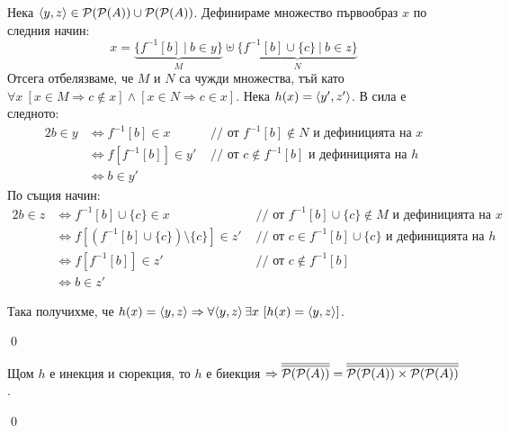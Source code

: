 \begin{tcolorbox}[mybox={Доказателство:}]
\quad
Нека $\langle y, z \rangle \in \mathcal{P}(\mathcal{P}(A)) \cup \mathcal{P}(\mathcal{P}(A))$. Дефинираме множество първообраз $x$ по следния начин:
\[
x = \underbrace{\{f^{-1}[b]\ |\ b \in y\}}_{M} \uplus \underbrace{\{f^{-1}[b] \cup \{c\}\ |\ b \in z\}}_{N}
\]
\quad
Отсега отбелязваме, че $M$ и $N$ са чужди множества, тъй като
$\forall x\ [x \in M \Rightarrow c \notin x] \land [x \in N \Rightarrow c \in x]$.
Нека $h(x) = \langle y', z' \rangle$.
В сила е следното:
\begin{alignat*}{2}
b \in y & \iff f^{-1}[b] \in x      & \text{ // от $f^{-1}[b] \notin N$ и дефиницията на $x$} \\
        & \iff f[f^{-1}[b]] \in y'  & \text{ // от $c \notin f^{-1}[b]$ и дефиницията на $h$} \\
		& \iff b \in y'             &
\end{alignat*}
\quad
По същия начин:
\begin{alignat*}{2}
b \in z & \iff f^{-1}[b] \cup \{c\} \in x                         & \text{ // от $f^{-1}[b] \cup \{c\} \notin M$ и дефиницията на $x$} \\
        & \iff f[(f^{-1}[b] \cup \{c\}) \setminus \{c\}] \in z'   & \text{ // от $c \in f^{-1}[b] \cup \{c\}$ и дефиницията на $h$} \\
        & \iff f[f^{-1}[b]] \in z'                                & \text{ // от $c \notin f^{-1}[b]$} \\
		& \iff b \in z'                                           &
\end{alignat*}

\quad
Така получихме, че $h(x) = \langle y, z \rangle \Rightarrow \forall \langle y, z \rangle\, \exists x\ [h(x) = \langle y, z \rangle]$.

\qed
\end{tcolorbox}

\quad
Щом $h$ е инекция и сюрекция, то $h$ е биекция
$\Rightarrow \overline{\overline{\mathcal{P}(\mathcal{P}(A))}} = \overline{\overline{\mathcal{P}(\mathcal{P}(A)) \times \mathcal{P}(\mathcal{P}(A))}}$.

\qed




